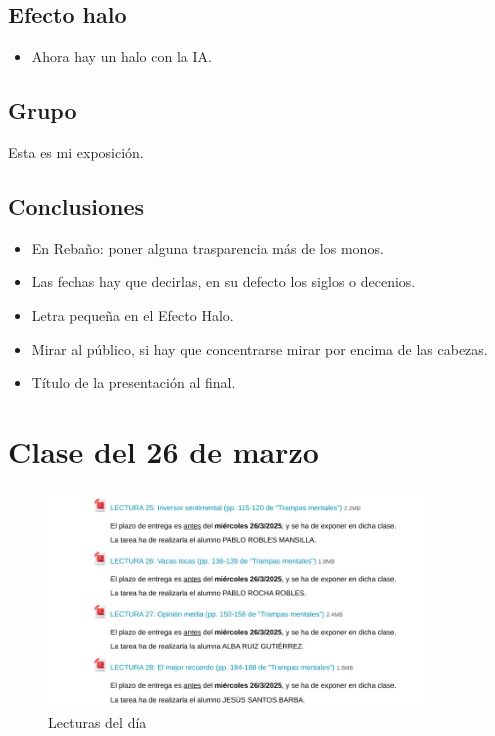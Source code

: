 \documentclass[12pt, a4paper, twoside]{article}
\begin{document}
\subsection{Efecto halo}
\begin{itemize}
    \item Ahora hay un halo con la IA.
\end{itemize}

\subsection{Grupo}

Esta es mi exposición.
\subsection{Conclusiones}
\begin{itemize}
    \item En Rebaño: poner alguna trasparencia más de los monos.
    \item Las fechas hay que decirlas, en su defecto los siglos o decenios.
    \item Letra pequeña en el Efecto Halo.
    \item Mirar al público, si hay que concentrarse mirar por encima de las cabezas.
    \item Título de la presentación al final.
\end{itemize}

\section{Clase del 26 de marzo}
    \begin{figure}[h]
        \centering
        \includegraphics[width=0.9\textwidth]{./Images/0326.jpg}
        \caption{Lecturas del día}
    \end{figure}
\end{document}
